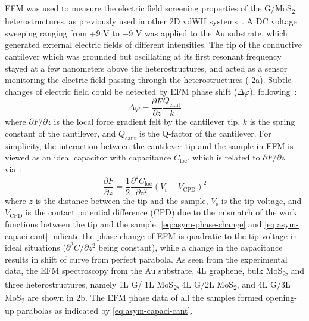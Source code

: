 EFM was used to measure the electric field screening properties of the
G/MoS\textsubscript{2} heterostructures, as previously used in other
2D vdWH
systems~\cite{Datta_2009_ML_Screening,Castellanos_Gomez_2012_interlayer,Li_2014_screen}.
%
A DC
voltage sweeping ranging from +9 V to −9 V was applied to the Au substrate, which generated
external electric fields of different intensities. The tip of the
conductive cantilever which was grounded but oscillating at its first
resonant frequency stayed at a few nanometers above the
heterostructures, and acted as a sensor monitoring the electric field
passing through the heterostructures ( 2a).
%
Subtle changes of electric field could be detected by EFM phase shift
($\Delta \varphi$), following~\cite{Li_2014_screen}:
\begin{equation}
  \label{eq:asym-phase-change}
  \Delta \varphi = \frac{\partial F}{\partial z} \frac{Q_{\mathrm{cant}}}{k} 
\end{equation}
where $\partial F/ \partial z$ is the local force gradient felt by the
cantilever tip, $k$ is the spring constant of the cantilever, and $Q_{\mathrm{cant}}$
is the Q-factor of the cantilever.
%
For simplicity, the interaction between the cantilever tip and the
sample in EFM is viewed as an ideal capacitor with capacitance
$C_{\mathrm{loc}}$, which is related to $\partial F/ \partial z$ via~\cite{Li_2014_screen}:
\begin{equation}
  \label{eq:asym-capaci-cant}
  \frac{\partial F}{\partial z} = \frac{1}{2} \frac{\partial^{2} C_{\mathrm{loc}}}{\partial z^{2}} (V_{\mathrm{s}} + V_{\mathrm{CPD}})^{2}
\end{equation}
where $z$ is the distance between the tip
and the sample, $V_{\mathrm{s}}$ is the tip voltage, and $V_{\mathrm{CPD}}$ is the contact potential difference (CPD) due to the  mismatch
of the work functions between the tip and the sample.
%
\autoref{eq:asym-phase-change} and \autoref{eq:asym-capaci-cant}
indicate the phase change of EFM is quadratic to the tip voltage in
ideal situations ($\partial^{2} C / \partial z^{2}$ being constant),
while a change in the capacitance results in shift of curve from perfect parabola.
%
As seen from the experimental data, the EFM spectroscopy from the Au
substrate, 4L graphene, bulk MoS\textsubscript{2}, and three
heterostructures, namely 1L G/ 1L MoS\textsubscript{2}, 4L G/2L
MoS\textsubscript{2}, and 4L G/3L MoS\textsubscript{2} are shown in
 2b.  The EFM phase data of all the samples formed
opening-up parabolas as indicated by \autoref{eq:asym-capaci-cant}.
